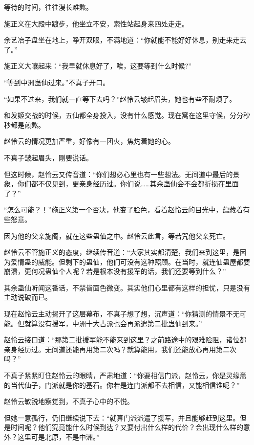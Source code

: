 
\begin{this_body}



等待的时间，往往漫长难熬。

施正义在大殿中踱步，他坐立不安，索性站起身来四处走走。

余艺冶子盘坐在地上，睁开双眼，不满地道：“你就能不能好好休息，别走来走去了。”

施正义大嚷起来：“我早就休息好了，唉，这要等到什么时候?”

“等到中洲蛊仙过来。”不真子开口。

“如果不过来，我们就一直等下去吗？”赵怜云皱起眉头，她也有些不耐烦了。

和发姬交战的时候，五仙都全身投入，没有什么感觉。现在窝在这里守候，分分秒秒都是煎熬。

赵怜云的情况更加严重，好像有一团火，焦灼着她的心。

不真子皱起眉头，刚要说话。

但这时候，赵怜云又传音道：“你们想必心里也有一些想法。无间道中最后的景象，你们都不仅见到，更亲身经历过。你们说……其余蛊仙会不会都折损在里面了？”

“怎么可能？！”施正义第一个否决，他变了脸色，看着赵怜云的目光中，蕴藏着有些怒意。

因为他的父亲施阁，就在这些蛊仙之中。赵怜云此言，等若咒他父亲死亡。

赵怜云不管施正义的态度，继续传音道：“大家其实都清楚，我们来到这里，是因为爱情蛊的威能。但剩下的蛊仙，他们可没有这种照顾。在当时，就连仙蛊屋都要崩溃，更何况蛊仙个人呢？若是根本没有援军的话，我们还要等到什么？”

其余蛊仙听闻这番话，不禁皆面色微变。其实他们心里都有这样的担忧，只是没有主动说破而已。

现在赵怜云主动揭开了这层幕布，不真子想了想，沉声道：“你猜测的情景不无可能。但就算没有援军，中洲十大古派也会再派遣第二批蛊仙到来。”

赵怜云接口道：“那第二批援军能不能来到这里？之前路途中的艰难险阻，诸位都亲身经历过。无间道还能再用第二次吗？就算能用，我们还能放心再用第二次吗？”

不真子紧紧盯住赵怜云的眼睛，严肃地道：“你要相信门派，赵怜云，你是灵缘斋的当代仙子，门派就是你的基石。你若是连门派都不去相信，又能相信谁呢？”

赵怜云敏锐地察觉到，不真子心中的不悦。

但她一意孤行，仍旧继续说下去：“就算门派派遣了援军，并且能够赶到这里。但是时间呢？他们究竟能什么时候到达？又要付出什么样的代价？会出现什么样的意外？这里可是北原，不是中洲。”


\end{this_body}
